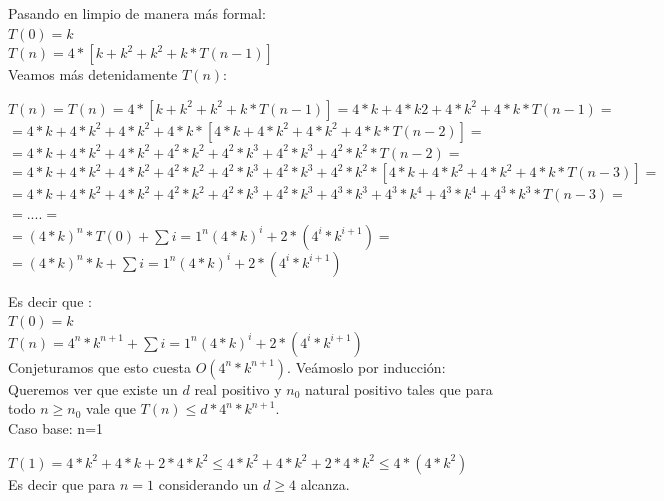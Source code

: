 \indent Pasando en limpio de manera más formal:\\
\indent $T(0)=k$\\
\indent $T(n)=4*[k + k^{2} + k^{2} + k* T(n-1)]$\\

\indent Veamos más detenidamente $T(n)$:\\
\begin{center}
\indent $T(n)= T(n)=4*[k + k^{2} + k^{2} + k* T(n-1)] = 4*k + 4*k{2} + 4*k^{2} + 4*k * T(n-1)=$ \\
\indent $= 4*k + 4*k^{2} + 4*k^{2} + 4*k *[4*k + 4*k^{2} + 4*k^{2} + 4*k * T(n-2)]=$\\
\indent $=4*k + 4*k^{2} + 4*k^{2} + 4^{2}*k^{2} + 4^{2}*k^{3} + 4^{2}*k^{3}+ 4^{2}*k^{2} * T(n-2)=$\\
\indent $=4*k + 4*k^{2} + 4*k^{2} + 4^{2}*k^{2} + 4^{2}*k^{3} + 4^{2}*k^{3}+ 4^{2}*k^{2} * [4*k + 4*k^{2} + 4*k^{2} + 4*k* T(n-3)]=$\\
\indent $=4*k + 4*k^{2} + 4*k^{2} + 4^{2}*k^{2} + 4^{2}*k^{3} + 4^{2}*k^{3}+ 4^{3}*k^{3} + 4^{3}*k^{4} + 4^{3}*k^{4} + 4^{3}*k^{3} * T(n-3)=$\\
\indent $=....=$\\
\indent $=  (4*k)^{n} * T(0) + \sum{i=1}^{n} (4*k)^{i} + 2 * (4^{i}* k^{i+1})=$ \\
\indent $=  (4*k)^{n} * k + \sum{i=1}^{n} (4*k)^{i} + 2 * (4^{i}* k^{i+1})$ \\
\end{center}


\indent Es decir que :\\

\indent $T(0)=k$\\
\indent $T(n)= 4^{n}* k^{n+1} + \sum{i=1}^{n} (4*k)^{i} + 2 * (4^{i}* k^{i+1})$\\

\indent Conjeturamos que esto cuesta $O(4^{n}*k^{n+1})$. Veámoslo por inducción:\\

\indent Queremos ver que existe un $d$ real positivo y $n_{0}$ natural positivo tales que para todo $n\geq n_{0}$ vale que $T(n) \leq d * 4^{n}*k^{n+1}$.\\
\indent Caso base: n=1 \\

\begin{center}
\indent  $T(1)=4* k^{2} + 4*k + 2 * 4* k^{2} \leq 4* k^{2} + 4*k^{2} + 2 * 4* k^{2} \leq 4* (4*k^2)$\\
\indent Es decir que para $n=1$ considerando un $d \geq 4 $ alcanza.\\
\end{center}

